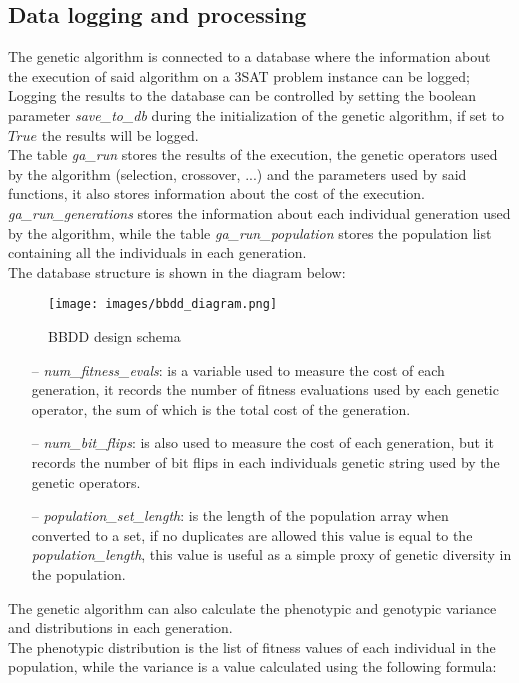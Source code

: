 \subsection{Data logging and processing}
\label{subsection:data_desc}

The genetic algorithm is connected to a database where the information about the execution of said algorithm on a 3SAT problem instance can be logged; Logging the results to the database can be controlled by setting the boolean parameter \textit{save\_to\_db} during the initialization of the genetic algorithm, if set to $True$ the results will be logged.
\\The table \textit{ga\_run} stores the results of the execution, the genetic operators used by the algorithm (selection, crossover, ...) and the parameters used by said functions, it also stores information about the cost of the execution.
\\\textit{ga\_run\_generations} stores the information about each individual generation used by the algorithm, while the table \textit{ga\_run\_population} stores the population list containing all the individuals in each generation.
\\The database structure is shown in the diagram below:

\begin{figure}[!ht]
	\centering
	\texttt{[image: images/bbdd\_diagram.png]}
	\caption{ BBDD design schema}
	\label{fig:BBDD_diagram}
\end{figure}

\begin{itemize}
\item[--]\textit{num\_fitness\_evals}: is a variable used to measure the cost of each generation, it records the number of fitness evaluations used by each genetic operator, the sum of which is the total cost of the generation.
\item[--]\textit{num\_bit\_flips}: is also used to measure the cost of each generation, but it records the number of bit flips in each individuals genetic string used by the genetic operators.
\item[--]\textit{population\_set\_length}: is the length of the population array when converted to a set, if no duplicates are allowed this value is equal to the \textit{population\_length}, this value is useful as a simple proxy of genetic diversity in the population.
\end{itemize}

The genetic algorithm can also calculate the phenotypic and genotypic variance and distributions in each generation.
\\The phenotypic distribution is the list of fitness values of each individual in the population, while the variance is a value calculated using the following formula:

